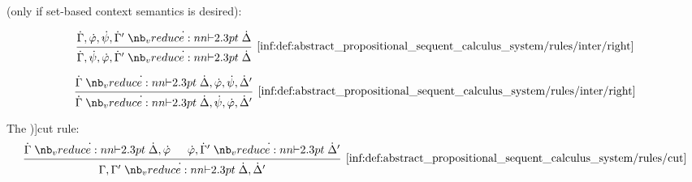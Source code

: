 \begin{definition}
\begin{thmenum}
      (only if set-based context semantics is desired):
    \begin{paracol}{2}
      \begin{leftcolumn}
        \begin{equation*}\taglabel[\ensuremath{ \logic{Inter}_L }]{inf:def:abstract_propositional_sequent_calculus_system/rules/inter/left}
          \begin{prooftree}
            \hypo{ \syn\Gamma, \syn\varphi, \syn\psi, \syn\Gamma' \synvdash \syn\Delta }
            \infer1[\ref{inf:def:abstract_propositional_sequent_calculus_system/rules/inter/right}]{ \syn\Gamma, \syn\psi, \syn\varphi, \syn\Gamma' \synvdash \syn\Delta }
          \end{prooftree}
        \end{equation*}
      \end{leftcolumn}

      \begin{rightcolumn}
        \begin{equation*}\taglabel[\ensuremath{ \logic{Inter}_R }]{inf:def:abstract_propositional_sequent_calculus_system/rules/inter/right}
          \begin{prooftree}
            \hypo{ \syn\Gamma \synvdash \syn\Delta, \syn\varphi, \syn\psi, \syn\Delta' }
            \infer1[\ref{inf:def:abstract_propositional_sequent_calculus_system/rules/inter/right}]{ \syn\Gamma \synvdash \syn\Delta, \syn\psi, \syn\varphi, \syn\Delta' }
          \end{prooftree}
        \end{equation*}
      \end{rightcolumn}
    \end{paracol}

     The \term[ru=правило сечения (\cite[219]{КолмогоровДрагалин2006Логика})]{cut rule}:
    \begin{equation*}\taglabel[\logic{Cut}]{inf:def:abstract_propositional_sequent_calculus_system/rules/cut}
      \begin{prooftree}
        \hypo{ \syn\Gamma \synvdash \syn\Delta, \syn\varphi }
        \hypo{ \syn\varphi, \syn\Gamma' \synvdash \syn\Delta' }
        \infer2[\ref{inf:def:abstract_propositional_sequent_calculus_system/rules/cut}]{ \Gamma, \Gamma' \synvdash \syn\Delta, \syn\Delta' }
      \end{prooftree}
    \end{equation*}
  \end{thmenum}
\end{definition}
